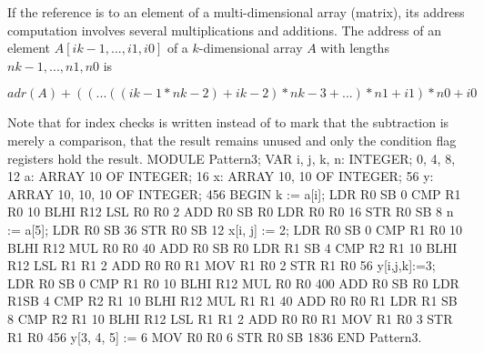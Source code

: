 If the reference is to an element of a multi-dimensional array (matrix), its address computation involves several multiplications and additions. The address of an element $A[ik-1, ... , i1, i0]$ of a $k$-dimensional array $A$ with lengths $nk-1, ... , n1, n0$ is

$$adr(A)+((...((ik-1 *nk-2)+ik-2)*nk-3 +...)*n1 +i1)*n0 +i0$$

Note that for index checks  is written instead of  to mark that the subtraction is merely a comparison, that the result remains unused and only the condition flag registers hold the result.
\begintt
MODULE Pattern3;
  VAR i, j, k, n: INTEGER;           0, 4, 8, 12
    a: ARRAY 10 OF INTEGER;          16
    x: ARRAY 10, 10 OF INTEGER;      56
    y: ARRAY 10, 10, 10 OF INTEGER;  456
BEGIN
  k := a[i];                         LDR  R0 SB 0
                                     CMP  R1 R0 10
                                     BLHI R12
                                     LSL  R0 R0 2
                                     ADD  R0 SB R0
                                     LDR  R0 R0 16
                                     STR  R0 SB 8
  n := a[5];                         LDR  R0 SB 36
                                     STR  R0 SB 12
  x[i, j] := 2;                      LDR  R0 SB 0
                                     CMP  R1 R0 10
                                     BLHI R12
                                     MUL  R0 R0 40
                                     ADD  R0 SB R0
                                     LDR  R1 SB 4
                                     CMP  R2 R1 10
                                     BLHI R12
                                     LSL  R1 R1 2
                                     ADD  R0 R0 R1
                                     MOV  R1 R0 2
                                     STR  R1 R0 56
  y[i,j,k]:=3;                       LDR  R0 SB 0
                                     CMP  R1 R0 10
                                     BLHI R12
                                     MUL  R0 R0 400
                                     ADD  R0 SB R0
                                     LDR  R1SB 4
                                     CMP  R2 R1 10
                                     BLHI R12
                                     MUL  R1 R1 40
                                     ADD  R0 R0 R1
                                     LDR  R1 SB 8
                                     CMP  R2 R1 10
                                     BLHI R12
                                     LSL  R1 R1 2
                                     ADD  R0 R0 R1
                                     MOV  R1 R0 3
                                     STR  R1 R0 456
  y[3, 4, 5] := 6                    MOV  R0 R0 6
                                     STR  R0 SB 1836
END Pattern3.
\endtt

